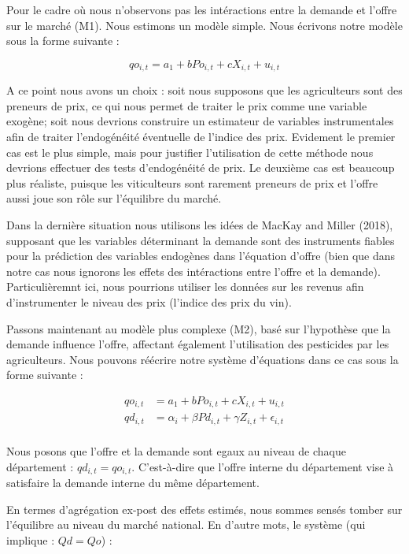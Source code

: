 \documentclass[11pt,]{article}
\begin{document}
Pour le cadre où nous n'observons pas les intéractions entre la demande
et l'offre sur le marché (M1). Nous estimons un modèle simple. Nous
écrivons notre modèle sous la forme suivante :

\begin{equation*}
  qo_{i,t} = a_1 + b Po_{i,t} + c X_{i,t} + u_{i,t}
\end{equation*}

A ce point nous avons un choix : soit nous supposons que les
agriculteurs sont des preneurs de prix, ce qui nous permet de traiter le
prix comme une variable exogène; soit nous devrions construire un
estimateur de variables instrumentales afin de traiter l'endogénéité
éventuelle de l'indice des prix. Evidement le premier cas est le plus
simple, mais pour justifier l'utilisation de cette méthode nous devrions
effectuer des tests d'endogénéité de prix. Le deuxième cas est beaucoup
plus réaliste, puisque les viticulteurs sont rarement preneurs de prix
et l'offre aussi joue son rôle sur l'équilibre du marché.

Dans la dernière situation nous utilisons les idées de MacKay and Miller
(2018), supposant que les variables déterminant la demande sont des
instruments fiables pour la prédiction des variables endogènes dans
l'équation d'offre (bien que dans notre cas nous ignorons les effets des
intéractions entre l'offre et la demande). Particulièremnt ici, nous
pourrions utiliser les données sur les revenus afin d'instrumenter le
niveau des prix (l'indice des prix du vin).

Passons maintenant au modèle plus complexe (M2), basé sur l'hypothèse
que la demande influence l'offre, affectant également l'utilisation des
pesticides par les agriculteurs. Nous pouvons réécrire notre système
d'équations dans ce cas sous la forme suivante :

\begin{align*}
  qo_{i,t} & = a_1 + b Po_{i,t} + c X_{i,t} + u_{i,t} \\ 
  qd_{i,t} & = \alpha_{i} + \beta Pd_{i,t} + \gamma Z_{i,t} + \epsilon_{i,t}  \\
\end{align*}

Nous posons que l'offre et la demande sont egaux au niveau de chaque
département : \(qd_{i,t} = qo_{i,t}\). C'est-à-dire que l'offre interne
du département vise à satisfaire la demande interne du même département.

En termes d'agrégation ex-post des effets estimés, nous sommes sensés
tomber sur l'équilibre au niveau du marché national. En d'autre mots, le
système (qui implique : \(Qd = Qo\)) :
\end{document}
